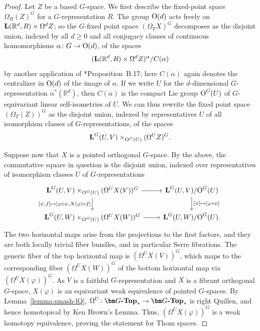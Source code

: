 \documentclass[reqno]{memo-l}
\theoremstyle{mythm}
\theoremstyle{definition}
\numberwithin{equation}{section}
\newcommand{\R} {{\mathbb{R}}}
\renewcommand{\phi}{\varphi}
\newcommand{\cat}[1]{\textbf{\textup{#1}}}
\renewcommand{\O}{{\textup{O}}}
\begin{document}
\begin{proof}Let $Z$ be a based $G$-space. We first describe the fixed-point space $\Omega_R(Z)^G$ for a $G$-representation $R$. 
  The group $\O(d)$ acts freely on $\cat L(\mathbb R^d,R)\times \Omega^dZ$; so the $G$-fixed point space $(\Omega_T X)^G$
  decomposes as the disjoint union, indexed by all $d\geq 0$ and all conjugacy classes of
  continuous homomorphisms $\alpha\colon G\to\O(d)$, of the spaces
  \[( \cat L(\mathbb R^d,R)\times \Omega^dZ)^{\alpha}/C(\alpha)\]
  by another application of \cite{schwede2018global}*{Proposition~B.17}; here $C(\alpha)$ again denotes the centralizer in $\O(d)$ of the image
  of $\alpha$. If we write $U$ for the $d$-dimensional $G$-representation $\alpha^*(\R^d)$, then $C(\alpha)$ 
  is the compact Lie group $\O^G(U)$ of $G$-equivariant linear self-isometries of $U$.
  We can thus rewrite the fixed point space $(\Omega_T(Z))^G$
  as the disjoint union, indexed by representatives $U$ of all isomorphism classes
  of $G$-representations, of the spaces
  \[\cat L^G(U,V)\times_{\O^G(U)} (\Omega^{U}Z)^G.\]

  Suppose now that $X$ is a pointed orthogonal $G$-space. 
  By the above, the commutative square in question is the disjoint union, indexed over representatives of isomorphism classes $U$ of $G$-representations 
  \[
  \begin{tikzcd}  \cat L^G(U,V)\times_{\O^G(U)} (\Omega^UX(V))^G\arrow[d,"{[\psi,f]\mapsto [\phi\circ \psi,X(\phi)\circ f]}"'] \arrow[r]&  \cat L^G(U,V)/\O^G(U) \arrow[d,"{[\psi]\mapsto [\phi\circ \psi]}"] \\
        \cat L^G(U,W)\times_{\O^G(U)} \mathcal (\Omega^UX(W))^G \arrow[r]& \cat L^G(U,W)/\O^G(U).
  \end{tikzcd}
\]
The two horizontal maps arise from the projections to the first factors, and they are both locally trivial fiber bundles, and in particular Serre fibrations.   The generic fiber of the top horizontal map is $(\Omega^UX(V))^G$, which maps to the corresponding fiber $(\Omega^UX(W))^G$ of the bottom horizontal map via $(\Omega^UX(\phi))^G$. 
  As $V$ is a faithful $G$-representation and $X$ is a fibrant orthogonal $G$-space, $X(\phi)$ is an equivariant weak equivalence of pointed $G$-spaces. By Lemma~\ref{lemma:smash-lQ}, $\Omega^U\colon\cat{$\bm G$-Top}_*\to\cat{$\bm G$-Top}_*$ is right Quillen, and hence homotopical by Ken Brown's Lemma. Thus, $(\Omega^UX(\phi))^G$ is a weak homotopy equivalence, proving the statement for Thom spaces. 


\end{proof}
\end{document}
